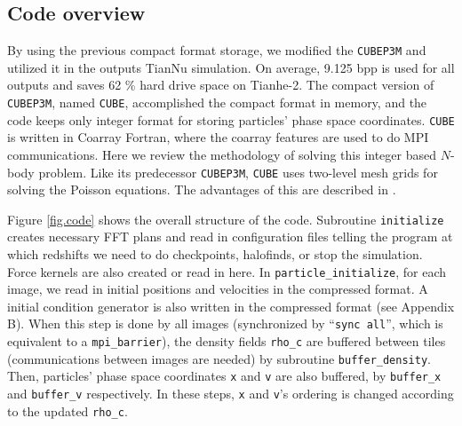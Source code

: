\documentclass[10pt,twocolumn,preprint]{emulateapj}
\begin{document}
\subsection{Code overview}
By using the previous compact format storage, we modified the {\tt CUBEP3M} and utilized it in the outputs TianNu simulation. On average, 9.125 bpp is used for all outputs and saves 62 \% hard drive space on Tianhe-2. The compact version of {\tt CUBEP3M}, named {\tt CUBE}, accomplished the compact format in memory, and the code keeps only integer format for storing particles' phase space coordinates. {\tt CUBE} is written in Coarray Fortran, where the coarray features are used to do MPI communications. Here we review the methodology of solving this integer based $N$-body problem. Like its predecessor {\tt CUBEP3M}, {\tt CUBE} uses two-level mesh grids for solving the Poisson equations. The advantages of this are described in \cite{2013MNRAS.436..540H}.

Figure \ref{fig.code} shows the overall structure of the code. Subroutine {\tt initialize} creates necessary FFT plans and read in configuration files telling the program at which redshifts we need to do checkpoints, halofinds, or stop the simulation. Force kernels are also created or read in here. In {\tt particle\_initialize}, for each image, we read in initial positions and velocities in the compressed format.  A initial condition generator is also written in the compressed format (see Appendix B). When this step is done by all images (synchronized by ``{\tt sync all}'', which is equivalent to a {\tt mpi\_barrier}), the density fields {\tt rho\_c} are buffered between tiles (communications between images are needed) by subroutine {\tt buffer\_density}. Then, particles' phase space coordinates {\tt x} and {\tt v} are also buffered, by {\tt buffer\_x} and {\tt buffer\_v} respectively. In these steps, {\tt x} and {\tt v}'s ordering is changed according to the updated {\tt rho\_c}.
\end{document}
